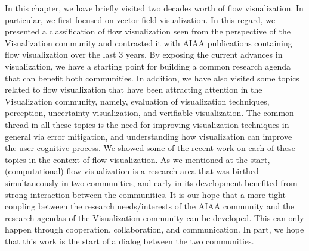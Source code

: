 In this chapter, we have briefly visited two decades worth of flow visualization.
%
In particular, we first focused on vector field visualization. In this regard, we presented a classification of flow visualization seen from the perspective of the Visualization community and contrasted it with AIAA publications containing flow visualization over the last 3 years. By exposing the current advances in visualization, we have a starting point for building a common research agenda that can benefit both communities.
%
In addition, we have also visited some topics related to flow visualization that have been attracting attention  in the Visualization community, namely, evaluation of visualization techniques, perception, uncertainty visualization, and verifiable visualization.  The common thread in all these topics is the need for improving  visualization techniques in general via error mitigation, and understanding how visualization can improve the user cognitive process. We showed some of the recent work on each of these topics in the context of flow visualization.
%
As we mentioned at the start, (computational) flow visualization is a research area that was birthed simultaneously in
two communities, and early in its development benefited from strong interaction between the communities.  It is our hope
that a more tight coupling between the research needs/interests of the AIAA community and the research agendas of the
Visualization community can be developed.  This can only happen through cooperation, collaboration, and communication.  
In part, we hope that this work is the start of a dialog between the two communities.

%

